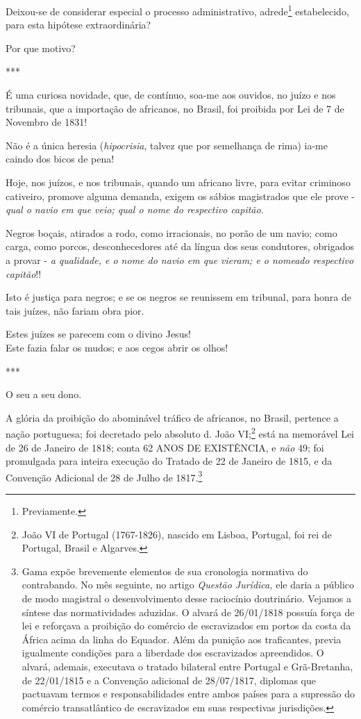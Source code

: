 Deixou-se de considerar especial o processo administrativo,
adrede\footnote{Previamente.} estabelecido, para esta hipótese
extraordinária?

Por que motivo?

***

É uma curiosa novidade, que, de contínuo, soa-me aos ouvidos, no juízo e
nos tribunais, que a importação de africanos, no Brasil, foi proibida
por Lei de 7 de Novembro de 1831!

Não é a única heresia (\emph{hipocrisia}, talvez que por semelhança de
rima) ia-me caindo dos bicos de pena!

Hoje, nos juízos, e nos tribunais, quando um africano livre, para evitar
criminoso cativeiro, promove alguma demanda, exigem os sábios
magistrados que ele prove - \emph{qual o navio em que veio; qual o nome
do respectivo capitão}.

Negros boçais, atirados a rodo, como irracionais, no porão de um navio;
como carga, como porcos, desconhecedores até da língua dos seus
condutores, obrigados a provar - \emph{a qualidade, e o nome do navio em
que vieram; e o nomeado respectivo capitão}!!

Isto é justiça para negros; e se os negros se reunissem em tribunal,
para honra de tais juízes, não fariam obra pior.

Estes juízes se parecem com o divino Jesus!\\
Este fazia falar os mudos; e aos cegos abrir os olhos!

***

O seu a seu dono.

A glória da proibição do abominável tráfico de africanos, no Brasil,
pertence a nação portuguesa; foi decretado pelo absoluto d. João
VI;\footnote{João VI de Portugal (1767-1826), nascido em Lisboa,
  Portugal, foi rei de Portugal, Brasil e Algarves.} está na memorável
Lei de 26 de Janeiro de 1818; conta 62 ANOS DE EXISTÊNCIA, e \emph{não}
49; foi promulgada para inteira execução do Tratado de 22 de Janeiro de
1815, e da Convenção Adicional de 28 de Julho de 1817.\footnote{Gama
  expõe brevemente elementos de sua cronologia normativa do contrabando.
  No mês seguinte, no artigo \emph{Questão Jurídica,} ele daria a
  público de modo magistral o desenvolvimento desse raciocínio
  doutrinário. Vejamos a síntese das normatividades aduzidas. O alvará
  de 26/01/1818 possuía força de lei e reforçava a proibição do comércio
  de escravizados em portos da costa da África acima da linha do
  Equador. Além da punição aos traficantes, previa igualmente condições
  para a liberdade dos escravizados apreendidos. O alvará, ademais,
  executava o tratado bilateral entre Portugal e Grã-Bretanha, de
  22/01/1815 e a Convenção adicional de 28/07/1817, diplomas que
  pactuavam termos e responsabilidades entre ambos países para a
  supressão do comércio transatlântico de escravizados em suas
  respectivas jurisdições.}

